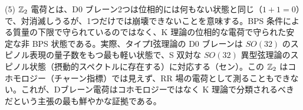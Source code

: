 \begin{solution}
(5) $\mathbb{Z}_2$ 電荷とは、D0 ブレーン2つは位相的には何もない状態と同じ（$1+1=0$）で、対消滅しうるが、1つだけでは崩壊できないことを意味する。BPS 条件による質量の下限で守られているのではなく、K 理論の位相的な電荷で守られた安定な非 BPS 状態である。実際、タイプI弦理論の D0 ブレーンは $SO(32)$ のスピノル表現の量子数をもつ最も軽い状態で、S 双対な $SO(32)$ 異型弦理論のスピノル状態（摂動的スペクトルに存在する）に対応する（セン）。この $\mathbb{Z}_2$ はコホモロジー（チャーン指標）では見えず、RR 場の電荷として測ることもできない。これが、Dブレーン電荷はコホモロジーではなく K 理論で分類されるべきだという主張の最も鮮やかな証拠である。
\end{solution}
